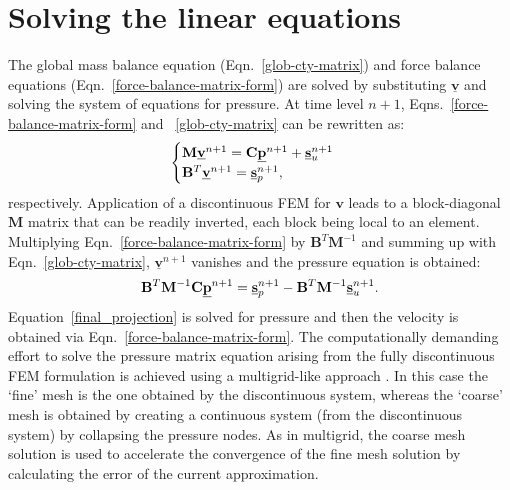 \section{Solving the linear equations}\label{ChapterMultiFluidsModel:Section:SolvingLinearEqns}
The global mass balance equation (Eqn.~\ref{glob-cty-matrix}) and force balance equations (Eqn.~\ref{force-balance-matrix-form}) are solved by substituting $\underline{\mathbf v}$ and solving the system of equations for pressure. At time level $n+1$, Eqns.~\ref{force-balance-matrix-form} and ~\ref{glob-cty-matrix} can be rewritten as:
\begin{displaymath}
  \begin{cases}
      \mathbf{M} \underline{\bf v}^{n+1} = \mathbf{C}\underline{\bf p}^{n+1} + \underline{\bf s}_{u}^{n+1} \\ 
      \mathbf{B}^{T} \underline{\bf v}^{n+1} = \underline{\bf s}_{p}^{n+1},
  \end{cases}
\end{displaymath}
respectively. Application of a discontinuous FEM for $\mathbf{v}$ leads to a block-diagonal $\mathbf{M}$ matrix that can be readily inverted, each block being local to an element. Multiplying Eqn.~\ref{force-balance-matrix-form} by $\mathbf{B}^{T}\mathbf{M}^{-1}$ and summing up with Eqn.~\ref{glob-cty-matrix}, $\underline{\mathbf v}^{n+1}$ vanishes and the pressure equation is obtained:
\begin{equation}
    \mathbf{B}^{T}\mathbf{M}^{-1} \mathbf{C} \underline{\bf p}^{n+1} =  \underline{\bf s}_{p}^{n+1} - \mathbf{B}^{T} \mathbf{M}^{-1}  \underline{\bf s}_{u}^{n+1}. \label{final_projection}
\end{equation}
Equation~\ref{final_projection} is solved for pressure and then the velocity is obtained via Eqn.~\ref{force-balance-matrix-form}. The computationally demanding effort to solve the pressure matrix equation arising from the fully discontinuous FEM formulation is achieved using a multigrid-like approach \citep[see][]{Brandt}. In this case the `fine' mesh is the one obtained by the discontinuous system, whereas the `coarse' mesh is obtained by creating a continuous system (from the discontinuous system) by collapsing the pressure nodes. As in multigrid, the coarse mesh solution is used to accelerate the convergence of the fine mesh solution by calculating the error of the current approximation.
